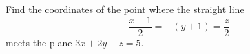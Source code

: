 Find the coordinates of the point where the straight line
\[
\dfrac{x-1}{2}=-(y+1)=\dfrac{z}{2}
\]
meets the plane $3x+2y-z=5$.

